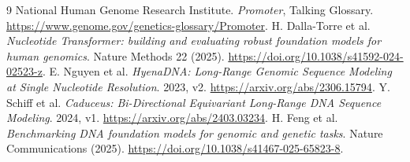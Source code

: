 \begin{thebibliography}{9}
 National Human Genome Research Institute.
\emph{Promoter}, Talking Glossary. \url{https://www.genome.gov/genetics-glossary/Promoter}.
 H. Dalla-Torre et al. \emph{Nucleotide Transformer:
building and evaluating robust foundation models for human genomics}.
Nature Methods 22 (2025). \url{https://doi.org/10.1038/s41592-024-02523-z}.
 E. Nguyen et al. \emph{HyenaDNA: Long-Range Genomic
Sequence Modeling at Single Nucleotide Resolution}. 2023, v2.
\url{https://arxiv.org/abs/2306.15794}.
 Y. Schiff et al. \emph{Caduceus: Bi-Directional
Equivariant Long-Range DNA Sequence Modeling}. 2024, v1.
\url{https://arxiv.org/abs/2403.03234}.
 H. Feng et al. \emph{Benchmarking DNA foundation
models for genomic and genetic tasks}. Nature Communications (2025).
\url{https://doi.org/10.1038/s41467-025-65823-8}.
\end{thebibliography}
